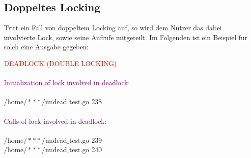 \subsection{Doppeltes Locking}
Tritt ein Fall von doppeltem Locking auf, so wird dem Nutzer das dabei 
involvierte Lock, sowie seine Aufrufe mitgeteilt. Im Folgenden ist ein Beispiel
für solch eine Ausgabe gegeben:
\begin{mdframed}[leftmargin=10pt,rightmargin=10pt]
  \textcolor{red}{DEADLOCK (DOUBLE LOCKING)}\\\\
  \textcolor{purple}{Initialization of lock involved in deadlock:}\\\\
  $/$home$/***/$undead$\_$test.go 238\\\\
  \textcolor{purple}{Calls of lock involved in deadlock:}\\\\
  $/$home$/***/$undead$\_$test.go 239\\
  $/$home$/***/$undead$\_$test.go 240\\\\
\end{mdframed}
